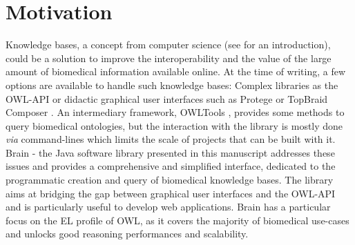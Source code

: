 \documentclass{bioinfo}
\begin{document}
\section{Motivation}
Knowledge bases, a concept from computer science (see \citealp{Krotzsch2012} for an introduction),
could be a solution to improve the interoperability and the value of the large amount of biomedical information available online.
At the time of writing, a few options are available to handle such knowledge bases: Complex
libraries as the OWL-API \citep{MatthewHorridge2011} or didactic graphical user interfaces such as
Protege \citep{StanfordCenterforBiomedicalInformaticsResearch} or TopBraid Composer \citep{TopQuadrant}. 
An intermediary framework, OWLTools \citep{MungallC},
provides some methods to query biomedical ontologies, but the interaction with the library is mostly done \emph{via} command-lines which
limits the scale of projects that can be built with it.
Brain - the Java software library presented in this manuscript addresses these issues and provides a comprehensive and simplified
interface, dedicated to the programmatic creation and query of biomedical knowledge bases. The library aims at bridging the gap between
graphical user interfaces and the OWL-API and is particularly useful to develop web applications.
Brain has a particular focus on the EL profile of OWL, as it covers the majority of biomedical
use-cases and unlocks good reasoning performances and scalability. 
\end{document}
